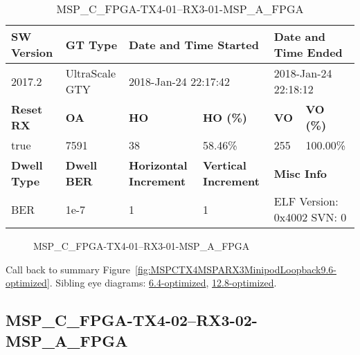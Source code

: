 \begin{table}[h]
\centering
\caption{MSP\_C\_FPGA-TX4-01--RX3-01-MSP\_A\_FPGA}
\label{tab:MSPCFPGATX401RX301MSPAFPGA9.6-optimized}
\begin{tabular}{@{}|l|l|l|l|l|l|@{}}
\toprule
\textbf{SW Version}                & \textbf{GT Type}   & \multicolumn{2}{l|}{\textbf{Date and Time Started}}            & \multicolumn{2}{l|}{\textbf{Date and Time Ended}}        \\ \midrule
2017.2                       & UltraScale GTY          & \multicolumn{2}{l|}{2018-Jan-24 22:17:42}                   & \multicolumn{2}{l|}{2018-Jan-24 22:18:12}               \\ \midrule
\textbf{Reset RX}                  & \textbf{OA} & \textbf{HO}   & \textbf{HO (\%)} & \textbf{VO} & \textbf{VO (\%)} \\ \midrule
true & 7591        & 38          & 58.46\%        & 255        & 100.00\%       \\ \midrule
\textbf{Dwell Type}                & \textbf{Dwell BER} & \textbf{Horizontal Increment} & \textbf{Vertical Increment}    & \multicolumn{2}{l|}{\textbf{Misc Info}}                  \\ \midrule
BER                            & 1e-7        & 1        & 1           & \multicolumn{2}{l|}{ELF Version: 0x4002 SVN: 0}                         \\ \bottomrule
\end{tabular}
\end{table}

\begin{figure}[h]
\caption{MSP\_C\_FPGA-TX4-01--RX3-01-MSP\_A\_FPGA} \label{fig:MSPCFPGATX401RX301MSPAFPGA9.6-optimized}
\end{figure}

Call back to summary Figure~\ref{fig:MSPCTX4MSPARX3MinipodLoopback9.6-optimized}.
Sibling eye diagrams: \hyperref[sec:MSPCFPGATX401RX301MSPAFPGA6.4-optimized]{6.4-optimized}, \hyperref[sec:MSPCFPGATX401RX301MSPAFPGA12.8-optimized]{12.8-optimized}.

\clearpage
\newpage


\subsection{MSP\_C\_FPGA-TX4-02--RX3-02-MSP\_A\_FPGA}\label{sec:MSPCFPGATX402RX302MSPAFPGA9.6-optimized}

